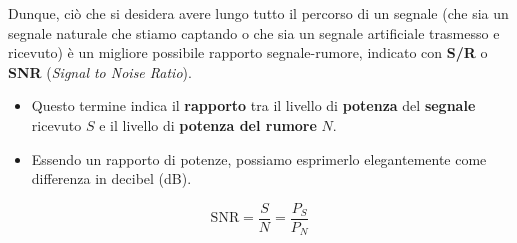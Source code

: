 \documentclass[openany,a4paper,12pt]{book}
\begin{document}
Dunque, ciò che si desidera avere lungo tutto il percorso di un segnale (che sia un segnale naturale che stiamo captando o che sia un segnale artificiale trasmesso e ricevuto) è un migliore possibile rapporto segnale-rumore, indicato con \textbf{S/R} o \textbf{SNR} (\textit{Signal to Noise Ratio}).

\begin{itemize}[label=\textcolor{PoliBlue}{\textbullet}]
    \item Questo termine indica il \textbf{rapporto} tra il livello di \textbf{potenza} del \textbf{segnale} ricevuto $S$ e il livello di \textbf{potenza del rumore} $N$.
    \item Essendo un rapporto di potenze, possiamo esprimerlo elegantemente come differenza in decibel (dB).
\end{itemize}

\begin{equation}
    \text{SNR} = \frac{S}{N} = \frac{P_S}{P_N}
\end{equation}
\end{document}
